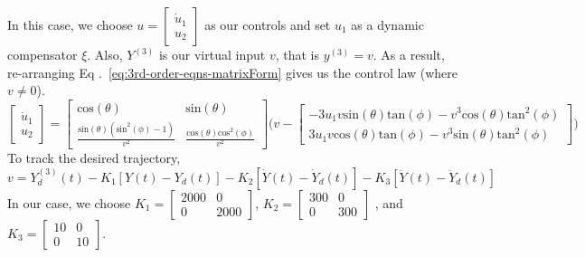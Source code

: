 \documentclass[letterpaper, 12pt]{article}
\begin{document}
In this case, we choose $u = \begin{bmatrix}
  \dot{u}_1\\
  u_2
\end{bmatrix}$ as our controls and set $u_1$ as a dynamic compensator $\xi$. Also, $Y^{(3)}$ is our virtual input $v$, that is $y^{(3)} = v$. As a result, re-arranging Eq .~\ref{eq:3rd-order-eqns-matrixForm} gives us the control law (where $v\neq 0$).
\begin{equation}\label{eq:control-laws}
    \begin{bmatrix}
      \dot{u}_1\\
      u_2
    \end{bmatrix} = 
    \begin{bmatrix}
      \text{cos}(\theta) & \text{sin}(\theta)\\
      \frac{\text{sin}(\theta)(\text{sin}^2(\phi)-1)}{v^2} & \frac{\text{cos}(\theta)\text{cos}^2(\phi)}{v^2} 
    \end{bmatrix}
    \Bigg(v - 
  \begin{bmatrix}
      -3u_1v\text{sin}(\theta)\text{tan}(\phi) - v^3\text{cos}(\theta)\text{tan}^2(\phi)\\
      3u_1v\text{cos}(\theta)\text{tan}(\phi) - v^3\text{sin}(\theta)\text{tan}^2(\phi)
  \end{bmatrix}
  \Bigg)
\end{equation}
To track the desired trajectory,
\begin{equation}\label{eq:virtual-input}
    v = Y^{(3)}_d(t) - K_1 [Y(t) - Y_d(t)] - K_2[\dot{Y}(t) - \dot{Y}_d(t)] - K_3[\ddot{Y}(t) - \ddot{Y}_d(t)]
\end{equation}
In our case, we choose $K_1 = 
\begin{bmatrix}
    2000 & 0\\
    0 & 2000
\end{bmatrix}$,
$K_2 = 
\begin{bmatrix}
    300 & 0 \\ 0 & 300
\end{bmatrix}$
, and $K_3 = 
\begin{bmatrix}
    10 & 0\\ 0 & 10
\end{bmatrix}$.\\
\end{document}
